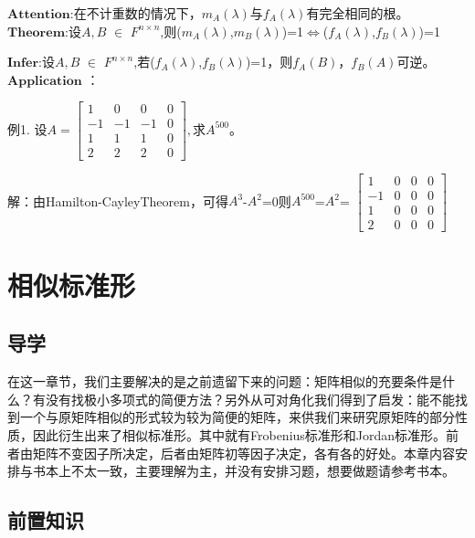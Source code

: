 \documentclass[lang=cn,10pt]{elegantbook}
\begin{document}
$\mathbf{Attention}$:在不计重数的情况下，$m_{\mathit{A}}(\lambda)$与$f_{\mathit{A}}(\lambda)$有完全相同的根。~\\

$\mathbf{Theorem}$:设$\mathit{A,B}$ $\in$ $\mathit{F^{n\times n} }$,则($m_{\mathit{A}}(\lambda)$,$m_{\mathit{B}}(\lambda)$)=1$\Leftrightarrow $($f_{\mathit{A}}(\lambda)$,$f_{\mathit{B}}(\lambda)$)=1

$\mathbf{Infer}$:设$\mathit{A,B}$ $\in$ $\mathit{F^{n\times n} }$,若($f_{\mathit{A}}(\lambda)$,$f_{\mathit{B}}(\lambda)$)=1，则$f_{\mathit{A}}(B)$，$f_{\mathit{B}}(A)$可逆。~\\

$\mathbf{Application}$ ：

例1. 设$\mathit{A}=
\begin{bmatrix}
	1&  0&  0& 0\\
	-1&  -1&-1  &0 \\
	1&  1&  1& 0\\
	2&2  &2  &0
\end{bmatrix},
$求$\mathit{A}^{500}$。

解：由Hamilton-CayleyTheorem，可得$\mathit{A}^{3}$-$\mathit{A}^{2}$=0则$\mathit{A}^{500}$=$\mathit{A}^{2}$=
$\begin{bmatrix}
	1&  0&  0& 0\\
	-1&  0&0  &0 \\
	1&  0&  0& 0\\
	2&0  &0  &0
\end{bmatrix}$

\chapter{相似标准形}
\section{导学}

在这一章节，我们主要解决的是之前遗留下来的问题：矩阵相似的充要条件是什么？有没有找极小多项式的简便方法？另外从可对角化我们得到了启发：能不能找到一个与原矩阵相似的形式较为较为简便的矩阵，来供我们来研究原矩阵的部分性质，因此衍生出来了相似标准形。其中就有Frobenius标准形和Jordan标准形。前者由矩阵不变因子所决定，后者由矩阵初等因子决定，各有各的好处。本章内容安排与书本上不太一致，主要理解为主，并没有安排习题，想要做题请参考书本。~\\

\section{前置知识}
\end{document}
